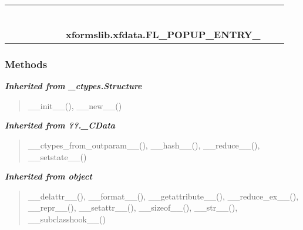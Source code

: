     \label{xformslib:xfdata:FL_POPUP_ENTRY_}
\begin{tabular}{cccccccccc}
\multicolumn{2}{r}{\settowidth{\BCL}{object}\multirow{2}{\BCL}{object}}
&&
&&
&&
  \\\cline{3-3}
  &&\multicolumn{1}{c|}{}
&&
&&
&&
  \\
\multicolumn{4}{r}{\settowidth{\BCL}{??.\_CData}\multirow{2}{\BCL}{??.\_CData}}
&&
&&
  \\\cline{5-5}
  &&&&\multicolumn{1}{c|}{}
&&
&&
  \\
\multicolumn{6}{r}{\settowidth{\BCL}{\_ctypes.Structure}\multirow{2}{\BCL}{\_ctypes.Structure}}
&&
  \\\cline{7-7}
  &&&&&&\multicolumn{1}{c|}{}
&&
  \\
&&&&&&\multicolumn{2}{l}{\textbf{xformslib.xfdata.FL\_POPUP\_ENTRY\_}}
\end{tabular}



  \subsubsection{Methods}


\large{\textbf{\textit{Inherited from \_ctypes.Structure}}}

\begin{quote}
\_\_init\_\_(), \_\_new\_\_()
\end{quote}

\large{\textbf{\textit{Inherited from ??.\_CData}}}

\begin{quote}
\_\_ctypes\_from\_outparam\_\_(), \_\_hash\_\_(), \_\_reduce\_\_(), \_\_setstate\_\_()
\end{quote}

\large{\textbf{\textit{Inherited from object}}}

\begin{quote}
\_\_delattr\_\_(), \_\_format\_\_(), \_\_getattribute\_\_(), \_\_reduce\_ex\_\_(), \_\_repr\_\_(), \_\_setattr\_\_(), \_\_sizeof\_\_(), \_\_str\_\_(), \_\_subclasshook\_\_()
\end{quote}

